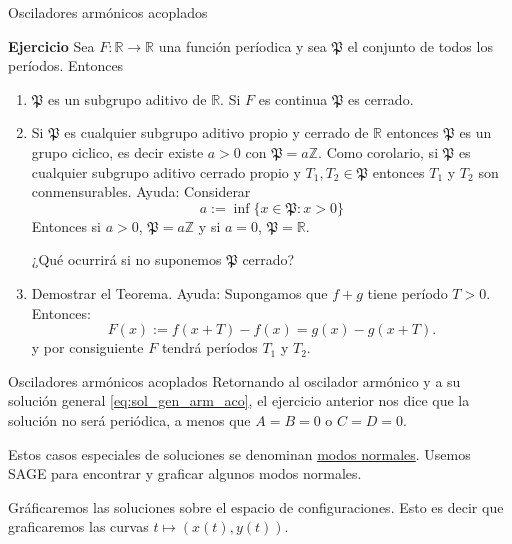 \documentclass[handout,hyperref={colorlinks=true}]{beamer}
\newcommand{\rr}{\mathbb{R}}
\renewcommand{\emph}[1]{\textcolor[rgb]{1,0,0}{#1}}
\begin{document}
\begin{frame}{Osciladores armónicos acoplados}

\textbf{Ejercicio} Sea $F:\rr\to\rr$ una función períodica y sea $\mathfrak{P}$ el conjunto de todos los períodos. Entonces
\begin{enumerate}
 \item $\mathfrak{P}$ es un subgrupo aditivo  de $\rr$. Si $F$ es continua $\mathfrak{P}$ es cerrado. 
 \item Si $\mathfrak{P}$ es cualquier subgrupo aditivo propio y cerrado de $\rr$  entonces  $\mathfrak{P}$ es un grupo ciclico, es decir existe $a>0$ con $\mathfrak{P}=a\mathbb{Z}$.  Como corolario, si $\mathfrak{P}$ es cualquier subgrupo  aditivo cerrado propio  y $T_1,T_2\in \mathfrak{P}$ entonces $T_1$ y $T_2$ son conmensurables. \emph{Ayuda:} Considerar
\[a:=\inf\{x\in \mathfrak{P}:x>0\}\]
Entonces si $a>0$,  $\mathfrak{P}=a\mathbb{Z}$ y si $a=0$,  $\mathfrak{P}=\rr$. 

¿Qué ocurrirá si no suponemos $\mathfrak{P}$ cerrado? 

 \item Demostrar el Teorema. \emph{Ayuda:} Supongamos  que $f+g$ tiene período $T>0$. Entonces:
\[F(x):=f(x+T)-f(x)=g(x)-g(x+T).\]
y por consiguiente $F$ tendrá períodos $T_1$ y $T_2$. 
 \end{enumerate} 
 

\end{frame}


\begin{frame}{Osciladores armónicos acoplados}
Retornando al oscilador armónico y a su solución general \eqref{eq:sol_gen_arm_aco}, el ejercicio anterior nos dice  que la solución no será periódica, a menos que $A=B=0$ o $C=D=0$. 

Estos casos especiales de soluciones se denominan \href{http://es.wikipedia.org/wiki/Modo_normal}{modos normales}.  Usemos SAGE para encontrar y graficar algunos modos normales. 

Gráficaremos las soluciones sobre el espacio de configuraciones. Esto es decir que graficaremos las curvas $t\mapsto (x(t),y(t))$. 



 

\end{frame}
\end{document}
